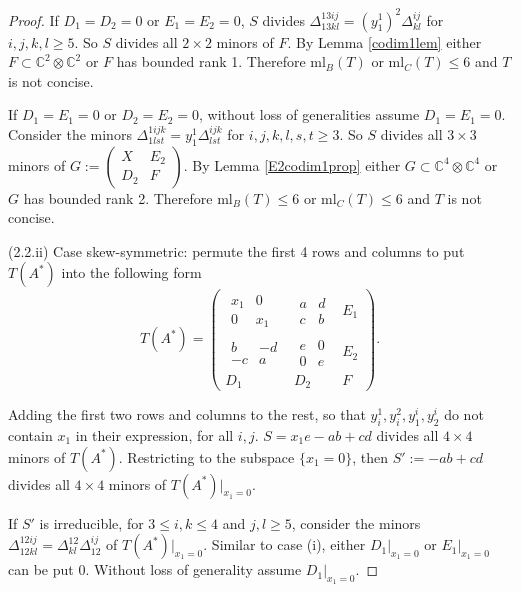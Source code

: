 \documentclass[10pt]{article} %
\theoremstyle{definition}
\begin{document}
\begin{proof}
If $D_1=D_2=0$ or $E_1=E_2=0$, $S$ divides $\Delta^{13ij}_{13kl}=(y^1_1)^2\Delta^{ij}_{kl}$ for $i,j,k,l\geq 5$. So $S$ divides all $2\times 2$ minors of $F$. By Lemma \ref{codim1lem} either $F\subset\mathbb{C}^2\otimes\mathbb{C}^2$ or $F$ has bounded rank 1. Therefore $\mathrm{ml}_B(T)$ or $\mathrm{ml}_C(T)\leq 6$ and $T$ is not concise.

If $D_1=E_1=0$ or $D_2=E_2=0$, without loss of generalities assume $D_1=E_1=0$. Consider the minors $\Delta^{1ijk}_{1lst}=y^1_1\Delta^{ijk}_{lst}$ for $i,j,k,l,s,t\geq 3$. So $S$ divides all $3\times 3$ minors of 
$G:=\begin{pmatrix}
X & E_2\\
D_2 & F
\end{pmatrix}$. 
By Lemma \ref{E2codim1prop} either $G\subset\mathbb{C}^4\otimes\mathbb{C}^4$ or $G$ has bounded rank 2. Therefore $\mathrm{ml}_B(T)\leq 6$ or $\mathrm{ml}_C(T)\leq 6$ and $T$ is not concise.

(2.2.ii) Case skew-symmetric: permute the first 4 rows and columns to put $T(A^*)$ into the following form
$$T(A^*)= \left(
    \begin{array}{c|c|c}
      \begin{matrix}
      x_1& 0\\0& x_1
      \end{matrix} & 
      \begin{matrix}
      a& d\\c& b
      \end{matrix}&E_1\\
      \hline
      \begin{matrix}
      b& -d\\-c& a
      \end{matrix} & 
      \begin{matrix}
      e& 0\\0& e
      \end{matrix}&E_2\\
      \hline
      D_1 &D_2 &F
    \end{array}
    \right).$$
    
Adding the first two rows and columns to the rest, so that $y^1_i,y^2_i,y^i_1,y^i_2$ do not contain $x_1$ in their expression, for all $i,j$. $S=x_1e-ab+cd$ divides all $4\times 4$ minors of $T(A^*)$. Restricting to the subspace $\{x_1=0\}$, then $S':=-ab+cd$ divides all $4\times 4$ minors of $T(A^*)|_{x_1=0}$. 

If $S'$ is irreducible, for $3\leq i,k\leq 4$ and $j,l\geq 5$, consider the minors $\Delta^{12ij}_{12kl}=\Delta^{12}_{kl}\Delta^{ij}_{12}$ of $T(A^*)|_{x_1=0}$. Similar to case (i), either $D_1|_{x_1=0}$ or $E_1|_{x_1=0}$ can be put 0. Without loss of generality assume $D_1|_{x_1=0}$.


\end{proof}
\end{document}
